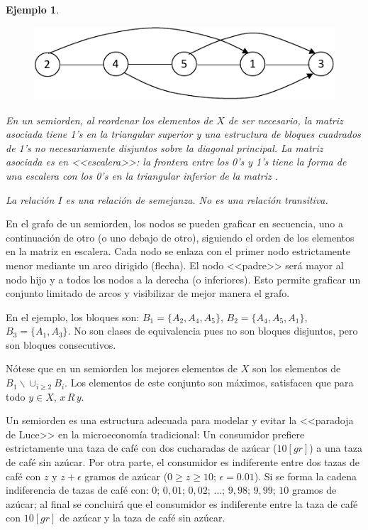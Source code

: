 \documentclass[a5paper,doc,10pt,noapacite]{apa6}
\newtheorem{ejem}{Ejemplo}
\begin{document}
{{\begin{ejem}
\vspace{-1\baselineskip}
\begin{figure}[H]
    \centering
    \includegraphics[scale=0.9]{Graficos/fig4_RB}
    \label{fig:RB_grafo4}
\end{figure}

En un semiorden, al reordenar los elementos de \(X\) de ser necesario, la matriz asociada tiene 1’s en la triangular superior y una estructura de bloques cuadrados de 1’s no necesariamente disjuntos sobre la diagonal principal. La matriz asociada es en <<escalera>>: la frontera entre los 0’s y 1’s tiene la forma de una escalera con los 0’s en la triangular inferior de la matriz \cite{Monjardet-1978}.

La relación \(I\) es una relación de semejanza. No es una relación transitiva.

\end{ejem}

En el grafo de un semiorden, los nodos se pueden graficar en secuencia, uno a continuación de otro (o uno debajo de otro), siguiendo el orden de los elementos en la matriz en escalera. Cada nodo se enlaza con el primer nodo estrictamente menor mediante un arco dirigido (flecha). El nodo <<padre>> será mayor al nodo hijo y a todos los nodos a la derecha (o inferiores). Esto permite graficar un conjunto limitado de arcos y visibilizar de mejor manera el grafo.

En el ejemplo, los bloques son: \(B_1 = \{A_2, A_4, A_5\}\), \(B_2 = \{A_4, A_5, A_1\}\), \(B_3 = \{A_1, A_3\}\). No son clases de equivalencia pues no son bloques disjuntos, pero son bloques consecutivos.

Nótese que en un semiorden los mejores elementos de \(X\) son los elementos de \(B_1 \backslash \cup _{i \geq 2} B_i\). Los elementos de este conjunto son máximos, satisfacen que para todo \(y \in X\), \(x \, R \, y\).

\vspace{1\baselineskip}
Un semiorden es una estructura adecuada para modelar y evitar la <<paradoja de Luce>> en la microeconomía tradicional: Un consumidor prefiere estrictamente una taza de café con dos cucharadas de azúcar (\(10 [gr]\)) a una taza de café sin azúcar. Por otra parte, el consumidor es indiferente entre dos tazas de café con \(z\) y \(z + \epsilon\) gramos de azúcar (\(0 \geq z \geq 10\); \(\epsilon = 0.01\)). Si se forma la cadena indiferencia de tazas de café con: \(0\); \(0,01\); \(0,02\); \(\dots\); \(9,98\); \(9,99\); \(10\) gramos de azúcar; al final se concluirá que el consumidor es indiferente entre la taza de café con \(10 [gr]\) de azúcar y la taza de café sin azúcar.

}}
\end{document}
